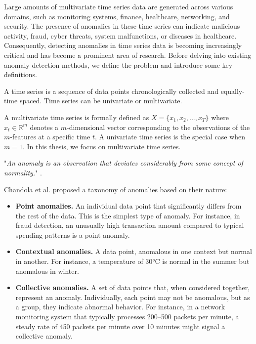 
Large amounts of multivariate time series data are generated across various domains, such as monitoring systems, finance, healthcare, networking, and security. The presence of anomalies in these time series can indicate malicious activity, fraud, cyber threats, system malfunctions, or diseases in healthcare. Consequently, detecting anomalies in time series data is becoming increasingly critical and has become a prominent area of research. Before delving into existing anomaly detection methods, we define the problem and introduce some key definitions.


\begin{definition}
    A time series is a sequence of data points chronologically collected and equally-time spaced. Time series can be univariate or multivariate.
\end{definition}
A multivariate time series is formally defined as $X = \{ x_1, x_2, ..., x_T\}$ where $x_t \in \mathbb{R}^m$ denotes a $m$-dimensional vector corresponding to the observations of the $m$-features at a specific time $t$. A univariate time series is the special case when $m=1$. In this thesis, we focus on multivariate time series.



\begin{definition}[Anomaly]
    "\textit{An anomaly is an observation that deviates considerably from some concept of normality.}" \cite{ruff2021unifying}.
\end{definition}
Chandola et al. \cite{chandola2009anomaly} proposed a taxonomy of anomalies based on their nature:
\begin{itemize}
    \item \textbf{Point anomalies.} An individual data point that significantly differs from the rest of the data. This is the simplest type of anomaly. For instance, in fraud detection, an unusually high transaction amount compared to typical spending patterns is a point anomaly.
    \item \textbf{Contextual anomalies.}  A data point, anomalous in one context but normal in another. For instance, a temperature of 30°C is normal in the summer but anomalous in winter.
    \item \textbf{Collective anomalies.} A set of data points that, when considered together, represent an anomaly. Individually, each point may not be anomalous, but as a group, they indicate abnormal behavior. For instance, in a network monitoring system that typically processes 200–500 packets per minute, a steady rate of 450 packets per minute over 10 minutes might signal a collective anomaly.
\end{itemize}


